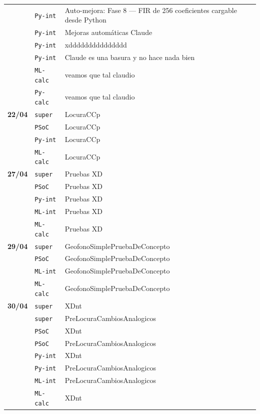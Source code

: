 \begin{longtable}{@{}p{1.7cm} p{1.5cm} p{12.2cm}@{}}
 & \texttt{\scriptsize Py-int} & Auto-mejora: Fase 8 --- FIR de 256 coeficientes cargable desde Python \\
 & \texttt{\scriptsize Py-int} & Mejoras automáticas Claude \\
 & \texttt{\scriptsize Py-int} & xddddddddddddddd \\
 & \texttt{\scriptsize Py-int} & Claude es una basura y no hace nada bien \\
 & \texttt{\scriptsize ML-calc} & veamos que tal claudio \\
 & \texttt{\scriptsize Py-calc} & veamos que tal claudio \\
\textbf{22/04} & \texttt{\scriptsize super} & LocuraCCp \\
 & \texttt{\scriptsize PSoC} & LocuraCCp \\
 & \texttt{\scriptsize Py-int} & LocuraCCp \\
 & \texttt{\scriptsize ML-calc} & LocuraCCp \\
\textbf{27/04} & \texttt{\scriptsize super} & Pruebas XD \\
 & \texttt{\scriptsize PSoC} & Pruebas XD \\
 & \texttt{\scriptsize Py-int} & Pruebas XD \\
 & \texttt{\scriptsize ML-int} & Pruebas XD \\
 & \texttt{\scriptsize ML-calc} & Pruebas XD \\
\textbf{29/04} & \texttt{\scriptsize super} & GeofonoSimplePruebaDeConcepto \\
 & \texttt{\scriptsize PSoC} & GeofonoSimplePruebaDeConcepto \\
 & \texttt{\scriptsize ML-int} & GeofonoSimplePruebaDeConcepto \\
 & \texttt{\scriptsize ML-calc} & GeofonoSimplePruebaDeConcepto \\
\textbf{30/04} & \texttt{\scriptsize super} & XDnt \\
 & \texttt{\scriptsize super} & PreLocuraCambiosAnalogicos \\
 & \texttt{\scriptsize PSoC} & XDnt \\
 & \texttt{\scriptsize PSoC} & PreLocuraCambiosAnalogicos \\
 & \texttt{\scriptsize Py-int} & XDnt \\
 & \texttt{\scriptsize Py-int} & PreLocuraCambiosAnalogicos \\
 & \texttt{\scriptsize ML-int} & PreLocuraCambiosAnalogicos \\
 & \texttt{\scriptsize ML-calc} & XDnt \\

\end{longtable}
